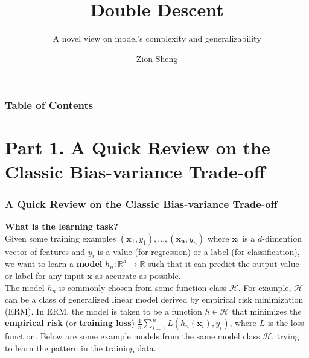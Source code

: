 \documentclass{beamer}
\title{Double Descent}
\subtitle{A novel view on model's complexity and generalizability}
\author[Zion Sheng] %
{Zion Sheng}
\institute[Duke ECE] %
{
	Department of ECE\\
	Duke University
}
\begin{document}
	\justifying
	\frame{\titlepage} 

	\begin{frame}
		\frametitle{Table of Contents}
		\tableofcontents
	\end{frame}

	\section{Part 1. A Quick Review on the Classic Bias-variance Trade-off}
	\begin{frame}[t]
		\frametitle{A Quick Review on the Classic Bias-variance Trade-off}
		\scriptsize
		\textbf{\small What is the learning task?}\\

		\vspace{2mm}
		Given some training examples $(\mathbf{x_1}, y_1),... , (\mathbf{x_n}, y_n)$ where $\mathbf{x_i}$ is a $d$-dimention vector of features and $y_i$ is a value (for regression) or a label (for classification), we want to learn a \textbf{model} $h_n: \mathbb{R}^d \to \mathbb{R}$ such that it can predict the output value or label for any input $\mathbf{x}$ as accurate as possible.\\
		
		\vspace{1mm}
		The model $h_n$ is commonly chosen from some function class $\mathcal{H}$. For example, $\mathcal{H}$ can be a class of generalized linear model derived by empirical risk minimization (ERM). In ERM, the model is taken to be a function $h \in \mathcal{H}$ that minimizes the \textbf{empirical risk} (or \textbf{training loss}) $\frac{1}{n}\sum^n_{i=1} L(h_n(\mathbf{x}_i), y_i)$, where $L$ is the loss function. Below are some example models from the same model class $\mathcal{H}$, trying to learn the pattern in the training data.\\


\end{frame}
\end{document}
